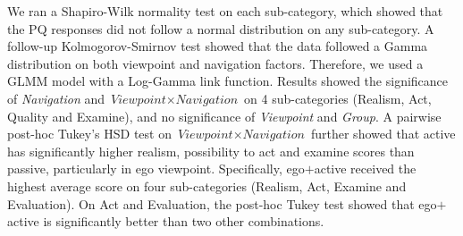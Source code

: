 We ran a Shapiro-Wilk normality test on each sub-category, which showed that the PQ responses did not follow a normal distribution on any sub-category.
A follow-up Kolmogorov-Smirnov test showed that the data followed a Gamma distribution on both viewpoint and navigation factors.
Therefore, we used a GLMM model with a Log-Gamma link function.
Results showed the significance of \textit{Navigation} and $\textit{Viewpoint} \times \textit{Navigation}$ on 4 sub-categories (Realism, Act, Quality and Examine), and no significance of \textit{Viewpoint} and \textit{Group}.
A pairwise post-hoc Tukey's HSD test on $\textit{Viewpoint} \times \textit{Navigation}$ further showed that active has significantly higher realism, possibility to act and examine scores than passive, particularly in ego viewpoint. Specifically, ego$+$active received the highest average score on four sub-categories (Realism, Act, Examine and Evaluation). On Act and Evaluation, the post-hoc Tukey test showed that ego$+$active is significantly better than two other combinations. 

